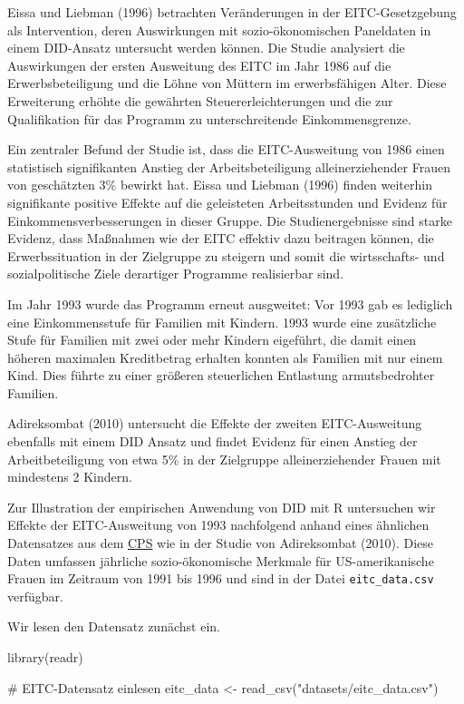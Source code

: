 \documentclass[
  a4paper,
  DIV=11,
  oneside]{scrreprt}
\newenvironment{Shaded}{\begin{snugshade}}{\end{snugshade}}
\newcommand{\CommentTok}[1]{\textcolor[rgb]{0.37,0.37,0.37}{#1}}
\newcommand{\FunctionTok}[1]{\textcolor[rgb]{0.28,0.35,0.67}{#1}}
\newcommand{\NormalTok}[1]{\textcolor[rgb]{0.00,0.23,0.31}{#1}}
\newcommand{\OtherTok}[1]{\textcolor[rgb]{0.00,0.23,0.31}{#1}}
\newcommand{\StringTok}[1]{\textcolor[rgb]{0.13,0.47,0.30}{#1}}
\begin{document}
Eissa und Liebman (1996) betrachten Veränderungen in der
EITC-Gesetzgebung als Intervention, deren Auswirkungen mit
sozio-ökonomischen Paneldaten in einem DID-Ansatz untersucht werden
können. Die Studie analysiert die Auswirkungen der ersten Ausweitung des
EITC im Jahr 1986 auf die Erwerbsbeteiligung und die Löhne von Müttern
im erwerbsfähigen Alter. Diese Erweiterung erhöhte die gewährten
Steuererleichterungen und die zur Qualifikation für das Programm zu
unterschreitende Einkommensgrenze.

Ein zentraler Befund der Studie ist, dass die EITC-Ausweitung von 1986
einen statistisch signifikanten Anstieg der Arbeitsbeteiligung
alleinerziehender Frauen von geschätzten 3\% bewirkt hat. Eissa und
Liebman (1996) finden weiterhin signifikante positive Effekte auf die
geleisteten Arbeitsstunden und Evidenz für Einkommensverbesserungen in
dieser Gruppe. Die Studienergebnisse sind starke Evidenz, dass Maßnahmen
wie der EITC effektiv dazu beitragen können, die Erwerbssituation in der
Zielgruppe zu steigern und somit die wirtsschafts- und sozialpolitische
Ziele derartiger Programme realisierbar sind.

Im Jahr 1993 wurde das Programm erneut ausgweitet: Vor 1993 gab es
lediglich eine Einkommensstufe für Familien mit Kindern. 1993 wurde eine
zusätzliche Stufe für Familien mit zwei oder mehr Kindern eigeführt, die
damit einen höheren maximalen Kreditbetrag erhalten konnten als Familien
mit nur einem Kind. Dies führte zu einer größeren steuerlichen
Entlastung armutsbedrohter Familien.

Adireksombat (2010) untersucht die Effekte der zweiten EITC-Ausweitung
ebenfalls mit einem DID Ansatz und findet Evidenz für einen Anstieg der
Arbeitbeteiligung von etwa 5\% in der Zielgruppe alleinerziehender
Frauen mit mindestens 2 Kindern.

Zur Illustration der empirischen Anwendung von DID mit R untersuchen wir
Effekte der EITC-Ausweitung von 1993 nachfolgend anhand eines ähnlichen
Datensatzes aus dem
\href{https://www.census.gov/programs-surveys/cps.html}{CPS} wie in der
Studie von Adireksombat (2010). Diese Daten umfassen jährliche
sozio-ökonomische Merkmale für US-amerikanische Frauen im Zeitraum von
1991 bis 1996 und sind in der Datei \texttt{eitc\_data.csv} verfügbar.

Wir lesen den Datensatz zunächst ein.

\begin{Shaded}
\begin{Highlighting}[]
\FunctionTok{library}\NormalTok{(readr)}

\CommentTok{\# EITC{-}Datensatz einlesen}
\NormalTok{eitc\_data }\OtherTok{\textless{}{-}} \FunctionTok{read\_csv}\NormalTok{(}\StringTok{"datasets/eitc\_data.csv"}\NormalTok{)}
\end{Highlighting}
\end{Shaded}
\end{document}
